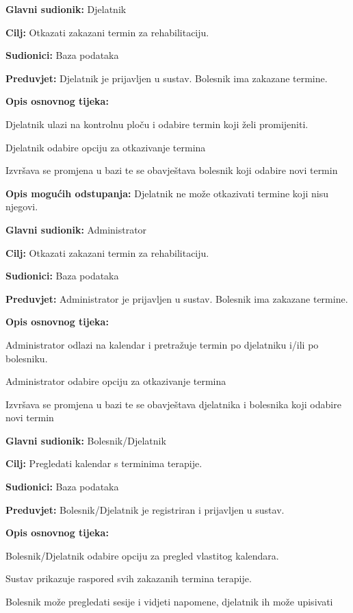 \documentclass[12pt]{report}
\newenvironment{packed_enum}{
	\begin{enumerate}
		\setlength{\itemsep}{0pt}
		\setlength{\parskip}{0pt}
		\setlength{\parsep}{0pt}
	}{\end{enumerate}}
\begin{document}
	\item \textbf{Glavni sudionik:} Djelatnik
	\item \textbf{Cilj:} Otkazati zakazani termin za rehabilitaciju.
	\item \textbf{Sudionici:} Baza podataka
	\item \textbf{Preduvjet:} Djelatnik je prijavljen u sustav. Bolesnik ima zakazane termine.
	\item \textbf{Opis osnovnog tijeka:}
	\begin{packed_enum}
        	\item Djelatnik ulazi na kontrolnu ploču i odabire termin koji želi promijeniti.
		\item Djelatnik odabire opciju za otkazivanje termina 
        	\item Izvršava se promjena u bazi te se obavještava bolesnik koji odabire novi termin 
	\end{packed_enum}
    \item \textbf{Opis mogućih odstupanja:}
	Djelatnik ne može otkazivati termine koji nisu njegovi. 
\closeusecase


	\item \textbf{Glavni sudionik:} Administrator
	\item \textbf{Cilj:} Otkazati zakazani termin za rehabilitaciju.
	\item \textbf{Sudionici:} Baza podataka
	\item \textbf{Preduvjet:} Administrator je prijavljen u sustav. Bolesnik ima zakazane termine.
	\item \textbf{Opis osnovnog tijeka:}
	\begin{packed_enum}
        	\item Administrator odlazi na kalendar i pretražuje termin po djelatniku i/ili po bolesniku.
		\item Administrator odabire opciju za otkazivanje termina 
        	\item Izvršava se promjena u bazi te se obavještava djelatnika i bolesnika koji odabire novi termin 
	\end{packed_enum}
\closeusecase


	\item \textbf{Glavni sudionik:} Bolesnik/Djelatnik
	\item \textbf{Cilj:} Pregledati kalendar s terminima terapije.
	\item \textbf{Sudionici:} Baza podataka
	\item \textbf{Preduvjet:} Bolesnik/Djelatnik je registriran i prijavljen u sustav.
	\item \textbf{Opis osnovnog tijeka:}
	\begin{packed_enum}
		\item Bolesnik/Djelatnik odabire opciju za pregled vlastitog kalendara.
		\item Sustav prikazuje raspored svih zakazanih termina terapije.
        	\item Bolesnik može pregledati sesije i vidjeti napomene, djelatnik ih može upisivati
	\end{packed_enum}
\closeusecase
\end{document}
